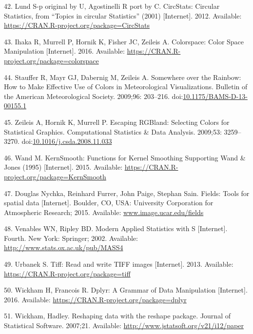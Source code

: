 \documentclass[]{article}
\begin{document}
\hypertarget{ref-lund_circstats:_2012}{}
42. Lund S-p original by U, Agostinelli R port by C. CircStats: Circular
Statistics, from ``Topics in circular Statistics'' (2001)
{[}Internet{]}. 2012. Available:
\url{https://CRAN.R-project.org/package=CircStats}

\hypertarget{ref-ihaka_colorspace:_2016}{}
43. Ihaka R, Murrell P, Hornik K, Fisher JC, Zeileis A. Colorspace:
Color Space Manipulation {[}Internet{]}. 2016. Available:
\url{https://CRAN.R-project.org/package=colorspace}

\hypertarget{ref-stauffer_somewhere_2009}{}
44. Stauffer R, Mayr GJ, Dabernig M, Zeileis A. Somewhere over the
Rainbow: How to Make Effective Use of Colors in Meteorological
Visualizations. Bulletin of the American Meteorological Society.
2009;96: 203--216.
doi:\href{https://doi.org/10.1175/BAMS-D-13-00155.1}{10.1175/BAMS-D-13-00155.1}

\hypertarget{ref-zeileis_escaping_2009}{}
45. Zeileis A, Hornik K, Murrell P. Escaping RGBland: Selecting Colors
for Statistical Graphics. Computational Statistics \& Data Analysis.
2009;53: 3259--3270.
doi:\href{https://doi.org/10.1016/j.csda.2008.11.033}{10.1016/j.csda.2008.11.033}

\hypertarget{ref-wand_kernsmooth:_2015}{}
46. Wand M. KernSmooth: Functions for Kernel Smoothing Supporting Wand
\& Jones (1995) {[}Internet{]}. 2015. Available:
\url{https://CRAN.R-project.org/package=KernSmooth}

\hypertarget{ref-douglas_nychka_fields:_2015}{}
47. Douglas Nychka, Reinhard Furrer, John Paige, Stephan Sain. Fields:
Tools for spatial data {[}Internet{]}. Boulder, CO, USA: University
Corporation for Atmospheric Research; 2015. Available:
\url{www.image.ucar.edu/fields}

\hypertarget{ref-venables_modern_2002}{}
48. Venables WN, Ripley BD. Modern Applied Statistics with S
{[}Internet{]}. Fourth. New York: Springer; 2002. Available:
\url{http://www.stats.ox.ac.uk/pub/MASS4}

\hypertarget{ref-urbanek_tiff:_2013}{}
49. Urbanek S. Tiff: Read and write TIFF images {[}Internet{]}. 2013.
Available: \url{https://CRAN.R-project.org/package=tiff}

\hypertarget{ref-wickham_dplyr:_2016}{}
50. Wickham H, Francois R. Dplyr: A Grammar of Data Manipulation
{[}Internet{]}. 2016. Available:
\url{https://CRAN.R-project.org/package=dplyr}

\hypertarget{ref-wickham_reshaping_2007}{}
51. Wickham, Hadley. Reshaping data with the reshape package. Journal of
Statistical Software. 2007;21. Available:
\url{http://www.jstatsoft.org/v21/i12/paper}
\end{document}
